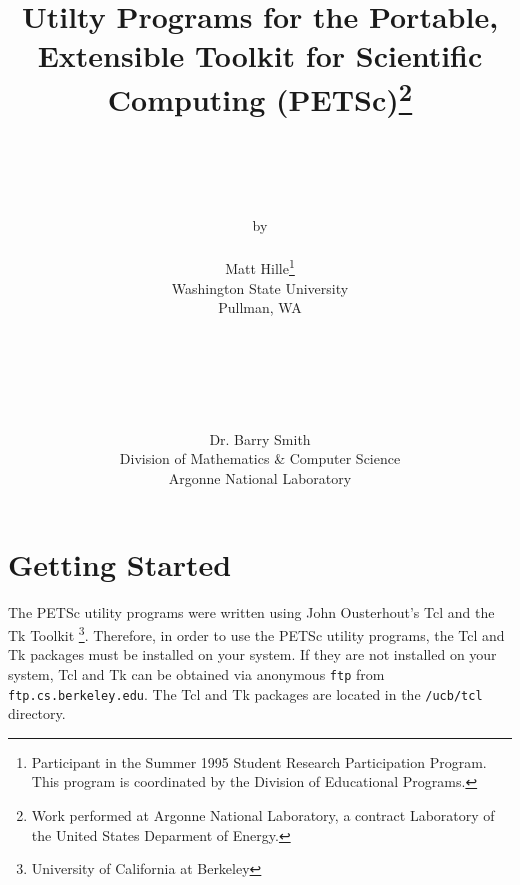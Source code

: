 
\def\note{\medskip \noindent Note:\begin{em}}
\def\endnote{\end{em} \medskip}






\begin{titlepage}

\title{Utilty Programs for the Portable, Extensible Toolkit for Scientific
	Computing (PETSc)\thanks{Work performed at Argonne National
	Laboratory, a contract Laboratory of the United States Deparment of
	Energy.}}

\author{\\ \\ \\ \\ by \\ \\ Matt Hille\thanks{Participant in the Summer 1995 Student
   Research Participation Program.  This program is coordinated by the 
   Division of Educational Programs.} \\ Washington State University \\ 
   Pullman, WA \\ \\ \\
\and
   \\ \\ \\ Dr. Barry Smith \\ Division of Mathematics \& Computer Science \\
   Argonne National Laboratory}

\end{titlepage}
\maketitle

\newpage 

\tableofcontents

\newpage
\section{Getting Started}

The PETSc utility programs were written using John Ousterhout's Tcl
and the Tk Toolkit \footnote{University of California at Berkeley}.
Therefore, in order to use the PETSc utility programs, the Tcl and Tk
packages must be installed on your system.  If they are not installed
on your system, Tcl and Tk can be obtained via anonymous {\tt ftp}
from {\tt ftp.cs.berkeley.edu}.  The Tcl and Tk packages are located
in the {\tt /ucb/tcl} directory.


